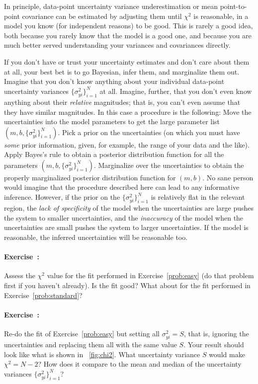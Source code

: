 \documentclass[12pt,twoside]{article}
\newcommand{\problemname}{Exercise}
\newcounter{problem}
\newenvironment{problem}{\paragraph{\problemname~\theproblem:}\refstepcounter{problem}}{}
\newcommand{\setofall}[3]{\{{#1}\}_{{#2}}^{{#3}}}
\newcommand{\allsigmay}{\setofall{\sigma_{yi}^2}{i=1}{N}}
\begin{document}
In principle, data-point uncertainty variance underestimation or mean
point-to-point covariance can be estimated by adjusting them until
$\chi^2$ is reasonable, in a model you know (for independent reasons)
to be good.  This is rarely a good idea, both because you rarely know
that the model is a good one, and because you are much better served
understanding your variances and covariances directly.

If you don't have or trust your uncertainty estimates and don't care
about them at all, your best bet is to go Bayesian, infer them, and
marginalize them out.  Imagine that you don't know anything about your
individual data-point uncertainty variances $\allsigmay$ at all.
Imagine, further, that you don't even know anything about their
\emph{relative} magnitudes; that is, you can't even assume that they
have similar magnitudes.  In this case a procedure is the following:
Move the uncertainties into the model parameters to get the large
parameter list $(m,b,\allsigmay)$.  Pick a prior on the uncertainties
(on which you must have \emph{some} prior information, given, for
example, the range of your data and the like).  Apply Bayes's rule to
obtain a posterior distribution function for all the parameters
$(m,b,\allsigmay)$.  Marginalize over the uncertainties to obtain the
properly marginalized posterior distribution function for $(m,b)$.  No
sane person would imagine that the procedure described here can lead
to any informative inference.  However, if the prior on the
$\allsigmay$ is relatively flat in the relevant region, the \emph{lack
  of specificity} of the model when the uncertainties are large pushes
the system to smaller uncertainties, and the \emph{inaccuracy} of the
model when the uncertainties are small pushes the system to larger
uncertainties.  If the model is reasonable, the inferred uncertainties
will be reasonable too.

\begin{problem}
Assess the $\chi^2$ value for the fit performed in
\problemname~\ref{prob:easy} (do that problem first if you haven't
already).  Is the fit good?  What about for the fit performed in
\problemname~\ref{prob:standard}?
\end{problem}

\begin{problem}\label{prob:chi2}
Re-do the fit of \problemname~\ref{prob:easy} but setting all
$\sigma_{yi}^2=S$, that is, ignoring the uncertainties and replacing
them all with the same value $S$.  Your result should look like what
is shown in \figurename~\ref{fig:chi2}.  What uncertainty variance
$S$ would make $\chi^2 = N-2$?  How does it compare to the mean and
median of the uncertainty variances $\allsigmay$?
\end{problem}
\end{document}
